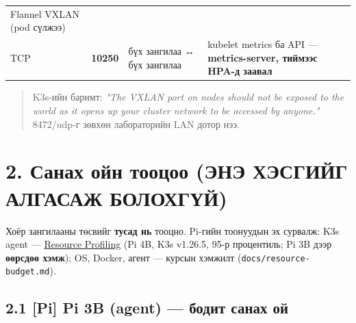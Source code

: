 \begin{longtable}[]{@{}llll@{}}
\begin{minipage}[t]{0.22\columnwidth}
Flannel VXLAN (pod сүлжээ)\strut
\end{minipage}\tabularnewline
\begin{minipage}[t]{0.22\columnwidth}\raggedright
TCP\strut
\end{minipage} & \begin{minipage}[t]{0.22\columnwidth}\raggedright
\textbf{10250}\strut
\end{minipage} & \begin{minipage}[t]{0.22\columnwidth}\raggedright
бүх зангилаа ↔ бүх зангилаа\strut
\end{minipage} & \begin{minipage}[t]{0.22\columnwidth}\raggedright
kubelet metrics ба API --- \textbf{metrics-server, тиймээс HPA-д заавал}\strut
\end{minipage}\tabularnewline
\bottomrule
\end{longtable}\endgroup

\begin{quote}
K3s-ийн баримт: \emph{"The VXLAN port on nodes should not be exposed to the world as it opens up your cluster network to be accessed by anyone."} 8472/udp-г зөвхөн лабораторийн LAN дотор нээ.
\end{quote}

\hypertarget{ux441ux430ux43dux430ux445-ux43eux439ux43d-ux442ux43eux43eux446ux43eux43e-ux44dux43dux44d-ux445ux44dux441ux433ux438ux439ux433-ux430ux43bux433ux430ux441ux430ux436-ux431ux43eux43bux43eux445ux433ux4afux439}{%
\section{2. Санах ойн тооцоо (ЭНЭ ХЭСГИЙГ АЛГАСАЖ БОЛОХГҮЙ)}\label{ux441ux430ux43dux430ux445-ux43eux439ux43d-ux442ux43eux43eux446ux43eux43e-ux44dux43dux44d-ux445ux44dux441ux433ux438ux439ux433-ux430ux43bux433ux430ux441ux430ux436-ux431ux43eux43bux43eux445ux433ux4afux439}}

Хоёр зангилааны төсвийг \textbf{тусад нь} тооцно. Pi-гийн тоонуудын эх сурвалж: K3s agent --- \href{https://docs.k3s.io/reference/resource-profiling}{Resource Profiling} (Pi 4B, K3s v1.26.5, 95-р процентиль; Pi 3B дээр \textbf{өөрсдөө хэмж}); OS, Docker, агент --- курсын хэмжилт (\texttt{docs/\allowbreak{}resource-budget.\allowbreak{}md}).

\hypertarget{pi-pi-3b-agent-ux431ux43eux434ux438ux442-ux441ux430ux43dux430ux445-ux43eux439}{%
\subsection{2.1 {[}Pi{]} Pi 3B (agent) --- бодит санах ой}\label{pi-pi-3b-agent-ux431ux43eux434ux438ux442-ux441ux430ux43dux430ux445-ux43eux439}}

